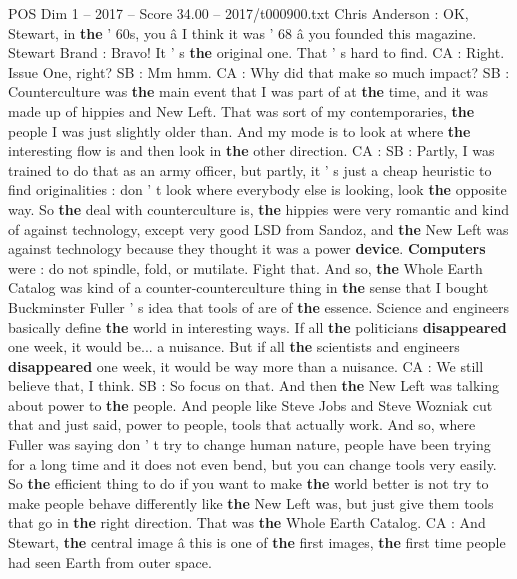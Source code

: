 \begin{textsample}{POS Dim 1 – 2017 – Score 34.00 – 2017/t000900.txt}  \label{ex:f1_pos_054}
Chris Anderson : OK, Stewart, in \textbf{the} ' 60s, you â I think it was ' 68 â you founded this magazine.
Stewart Brand : Bravo!
It ' s \textbf{the} original one.
That ' s hard to find.
CA : Right.
Issue One, right?
SB : Mm hmm.
CA : Why did that make so much impact?
SB : Counterculture was \textbf{the} main event that I was part of at \textbf{the} time, and it was made up of hippies and New Left.
That was sort of my contemporaries, \textbf{the} people I was just slightly older than.
And my mode is to look at where \textbf{the} interesting flow is and then look in \textbf{the} other direction.
CA : SB : Partly, I was trained to do that as an army officer, but partly, it ' s just a cheap heuristic to find originalities : don ' t look where everybody else is looking, look \textbf{the} opposite way.
So \textbf{the} deal with counterculture is, \textbf{the} hippies were very romantic and kind of against technology, except very good LSD from Sandoz, and \textbf{the} New Left was against technology because they thought it was a power \textbf{device}. \textbf{Computers} were : do not spindle, fold, or mutilate.
Fight that.
And so, \textbf{the} Whole Earth Catalog was kind of a counter-counterculture thing in \textbf{the} sense that I bought Buckminster Fuller ' s idea that tools of are of \textbf{the} essence.
Science and engineers basically define \textbf{the} world in interesting ways.
If all \textbf{the} politicians \textbf{disappeared} one week, it would be... a nuisance.
But if all \textbf{the} scientists and engineers \textbf{disappeared} one week, it would be way more than a nuisance.
CA : We still believe that, I think.
SB : So focus on that.
And then \textbf{the} New Left was talking about power to \textbf{the} people.
And people like Steve Jobs and Steve Wozniak cut that and just said, power to people, tools that actually work.
And so, where Fuller was saying don ' t try to change human nature, people have been trying for a long time and it does not even bend, but you can change tools very easily.
So \textbf{the} efficient thing to do if you want to make \textbf{the} world better is not try to make people behave differently like \textbf{the} New Left was, but just give them tools that go in \textbf{the} right direction.
That was \textbf{the} Whole Earth Catalog.
CA : And Stewart, \textbf{the} central image â this is one of \textbf{the} first images, \textbf{the} first time people had seen Earth from outer space.

\end{textsample}
